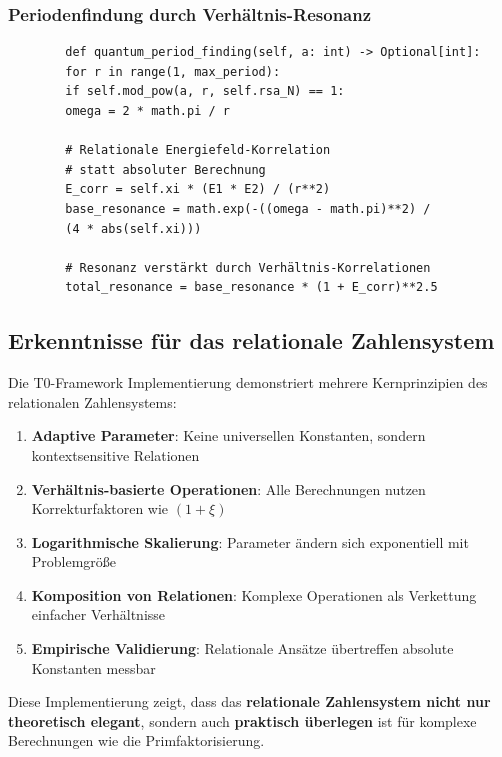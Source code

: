 	\subsubsection{Periodenfindung durch Verhältnis-Resonanz}
	\begin{verbatim}
		def quantum_period_finding(self, a: int) -> Optional[int]:
		for r in range(1, max_period):
		if self.mod_pow(a, r, self.rsa_N) == 1:
		omega = 2 * math.pi / r
		
		# Relationale Energiefeld-Korrelation 
		# statt absoluter Berechnung
		E_corr = self.xi * (E1 * E2) / (r**2)
		base_resonance = math.exp(-((omega - math.pi)**2) /
		(4 * abs(self.xi)))
		
		# Resonanz verstärkt durch Verhältnis-Korrelationen
		total_resonance = base_resonance * (1 + E_corr)**2.5
	\end{verbatim}
	
	\subsection{Erkenntnisse für das relationale Zahlensystem}
	
	Die T0-Framework Implementierung demonstriert mehrere Kernprinzipien des relationalen Zahlensystems:
	
	\begin{enumerate}
		\item \textbf{Adaptive Parameter}: Keine universellen Konstanten, sondern kontextsensitive Relationen
		\item \textbf{Verhältnis-basierte Operationen}: Alle Berechnungen nutzen Korrekturfaktoren wie $(1 + \xi)$
		\item \textbf{Logarithmische Skalierung}: Parameter ändern sich exponentiell mit Problemgröße
		\item \textbf{Komposition von Relationen}: Komplexe Operationen als Verkettung einfacher Verhältnisse
		\item \textbf{Empirische Validierung}: Relationale Ansätze übertreffen absolute Konstanten messbar
	\end{enumerate}
	
	Diese Implementierung zeigt, dass das \textbf{relationale Zahlensystem nicht nur theoretisch elegant}, sondern auch \textbf{praktisch überlegen} ist für komplexe Berechnungen wie die Primfaktorisierung.
